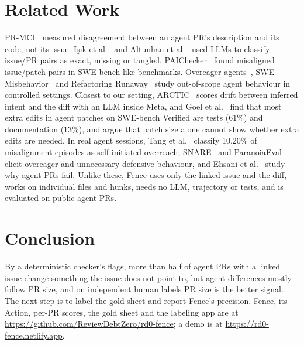 \documentclass[10pt,conference]{IEEEtran}
\begin{document}
\section{Related Work}
PR-MCI~\cite{gong2026prmci} measured disagreement between an agent PR's description and its code, not its issue. I\c{s}{\i}k et al.~\cite{isik2025forge} and Altunhan et al.~\cite{altunhan2026finetune} used LLMs to classify issue/PR pairs as exact, missing or tangled. PAIChecker~\cite{wang2026paichecker} found misaligned issue/patch pairs in SWE-bench-like benchmarks. Overeager agents~\cite{qu2026overeager}, SWE-Misbehavior~\cite{trong2026swemisbehavior} and Refactoring Runaway~\cite{tian2026runaway} study out-of-scope agent behaviour in controlled settings. Closest to our setting, ARCTIC~\cite{maddila2026arctic} scores drift between inferred intent and the diff with an LLM inside Meta, and Goel et al.~\cite{goel2026overedit} find that most extra edits in agent patches on SWE-bench Verified are tests (61\%) and documentation (13\%), and argue that patch size alone cannot show whether extra edits are needed. In real agent sessions, Tang et al.~\cite{tang2026fail} classify 10.20\% of misalignment episodes as self-initiated overreach; SNARE~\cite{qu2026snare} and ParanoiaEval~\cite{luo2026paranoia} elicit overeager and unnecessary defensive behaviour, and Ehsani et al.~\cite{ehsani2026fail} study why agent PRs fail. Unlike these, Fence uses only the linked issue and the diff, works on individual files and hunks, needs no LLM, trajectory or tests, and is evaluated on public agent PRs.

\section{Conclusion}
By a deterministic checker's flags, more than half of agent PRs with a linked issue change something the issue does not point to, but agent differences mostly follow PR size, and on independent human labels PR size is the better signal. The next step is to label the gold sheet and report Fence's precision. Fence, its Action, per-PR scores, the gold sheet and the labeling app are at \url{https://github.com/ReviewDebtZero/rd0-fence}; a demo is at \url{https://rd0-fence.netlify.app}.



\end{document}
